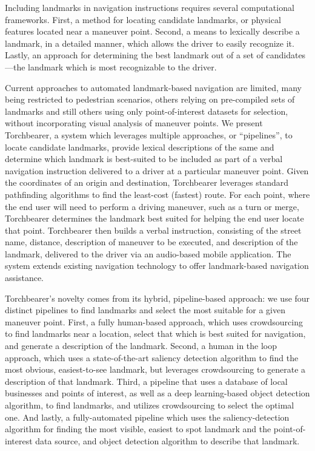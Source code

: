 Including landmarks in navigation instructions requires several computational frameworks. First, a method for locating candidate landmarks, or physical features located near a maneuver point. Second, a means to lexically describe a landmark, in a detailed manner, which allows the driver to easily recognize it. Lastly, an approach for determining the best landmark out of a set of candidates---the landmark which is most recognizable to the driver. 

Current approaches to automated landmark-based navigation are limited, many being restricted to pedestrian scenarios, others relying on pre-compiled sets of landmarks and still others using only point-of-interest datasets for selection, without incorporating visual analysis of maneuver points. We present Torchbearer, a system which leverages multiple approaches, or “pipelines”, to locate candidate landmarks, provide lexical descriptions of the same and determine which landmark is best-suited to be included as part of a verbal navigation instruction delivered to a driver at a particular maneuver point. Given the coordinates of an origin and destination, Torchbearer leverages standard pathfinding algorithms to find the least-cost (fastest) route. For each point, where the end user will need to perform a driving maneuver, such as a turn or merge, Torchbearer determines the landmark best suited for helping the end user locate that point. Torchbearer then builds a verbal instruction, consisting of the street name, distance, description of maneuver to be executed, and description of the landmark, delivered to the driver via an audio-based mobile application. The system extends existing navigation technology to offer landmark-based navigation assistance.
 
Torchbearer's novelty comes from its hybrid, pipeline-based approach: we use four distinct pipelines to find landmarks and select the most suitable for a given maneuver point. First, a fully human-based approach, which uses crowdsourcing to find landmarks near a location, select that which is best suited for navigation, and generate a description of the landmark. Second, a human in the loop approach, which uses a state-of-the-art saliency detection algorithm to find the most obvious, easiest-to-see landmark, but leverages crowdsourcing to generate a description of that landmark. Third, a pipeline that uses a database of local businesses and points of interest, as well as a deep learning-based object detection algorithm, to find landmarks, and utilizes crowdsourcing to select the optimal one. And lastly, a fully-automated pipeline which uses the saliency-detection algorithm for finding the most visible, easiest to spot landmark and the point-of-interest data source, and object detection algorithm to describe that landmark.

